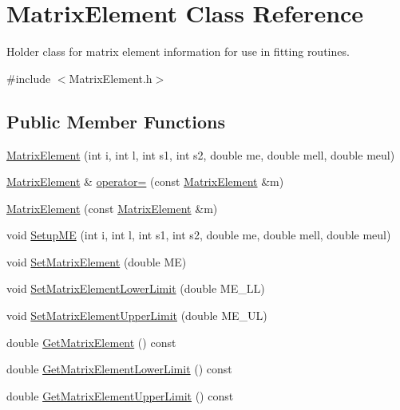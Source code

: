 \hypertarget{classMatrixElement}{\section{Matrix\-Element Class Reference}
\label{classMatrixElement}
}


Holder class for matrix element information for use in fitting routines.  




{\ttfamily \#include $<$Matrix\-Element.\-h$>$}

\subsection*{Public Member Functions}
\begin{DoxyCompactItemize}
\item 
\hyperlink{classMatrixElement_a83d60e7b205272e6f4094c9fc8cb4c4d}{Matrix\-Element} (int i, int l, int s1, int s2, double me, double mell, double meul)
\item 
\hyperlink{classMatrixElement}{Matrix\-Element} \& \hyperlink{classMatrixElement_a2d864d100fbfbd103fcd67875914db38}{operator=} (const \hyperlink{classMatrixElement}{Matrix\-Element} \&m)
\item 
\hyperlink{classMatrixElement_a30ac58221e03277afad4eed3adc09a0b}{Matrix\-Element} (const \hyperlink{classMatrixElement}{Matrix\-Element} \&m)
\item 
void \hyperlink{classMatrixElement_a540bcf73f6d9e18b30e66952b834e020}{Setup\-M\-E} (int i, int l, int s1, int s2, double me, double mell, double meul)
\item 
void \hyperlink{classMatrixElement_ad0794f7ee58205f378f282d3fc8f40bb}{Set\-Matrix\-Element} (double M\-E)
\item 
void \hyperlink{classMatrixElement_a9ec4a725c296b92e51f988001387c4e9}{Set\-Matrix\-Element\-Lower\-Limit} (double M\-E\-\_\-\-L\-L)
\item 
void \hyperlink{classMatrixElement_a65803cfefe893738af216b6c9f4018c0}{Set\-Matrix\-Element\-Upper\-Limit} (double M\-E\-\_\-\-U\-L)
\item 
double \hyperlink{classMatrixElement_a518a9a4711e4b2ee2b4a534f1bafc8d3}{Get\-Matrix\-Element} () const 
\item 
double \hyperlink{classMatrixElement_a5b8f8968deb10d9ed0ca18ad0273010c}{Get\-Matrix\-Element\-Lower\-Limit} () const 
\item 
double \hyperlink{classMatrixElement_ae8fd6df0ed51b6eddda1de3b41491b22}{Get\-Matrix\-Element\-Upper\-Limit} () const 

\end{DoxyCompactItemize}
